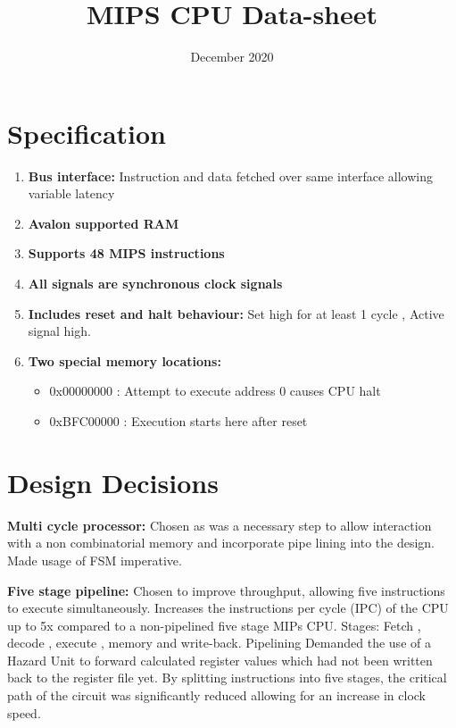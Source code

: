 \documentclass[10pt]{datasheet}
\title{MIPS CPU Data-sheet}
\date{December 2020}
\begin{document}
\maketitle

\section{Specification}


\begin{enumerate}
\item \textbf{Bus interface:} Instruction and data fetched over same interface allowing variable latency
\item \textbf{Avalon supported RAM}
\item \textbf{Supports 48 MIPS  instructions} 
\item \textbf{All signals are synchronous clock signals}
\item \textbf{Includes reset and halt behaviour:} 													Set high for at least 1 cycle , Active signal high.
\item \textbf{Two special memory locations:}											     	
\begin{itemize}
\item 0x00000000 : Attempt to execute address 0 causes CPU halt
\item 0xBFC00000 : Execution starts here after reset	

\end{itemize}
\end{enumerate}
 

\smallbreak

\section{Design Decisions}

\textbf{Multi cycle processor:} Chosen as was a necessary step to allow interaction with a non combinatorial memory and incorporate pipe lining into the design. Made usage of FSM imperative.

\textbf{Five stage pipeline:} Chosen to improve throughput, allowing five instructions to execute simultaneously. Increases the instructions per cycle (IPC) of the CPU up to 5x compared to a non-pipelined five stage MIPs CPU. Stages: Fetch , decode , execute , memory and write-back. Pipelining Demanded the use of a Hazard Unit to forward calculated register values which had not been written back to the register file yet. By splitting instructions into five stages, the critical path of the circuit was significantly reduced allowing for an increase in clock speed.
\end{document}
